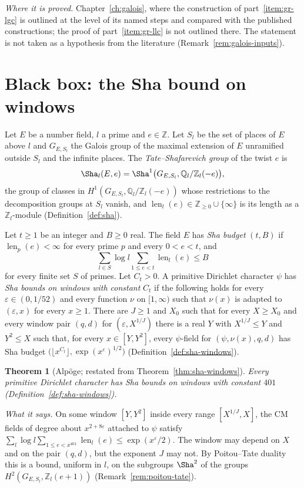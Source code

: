 \documentclass[11pt]{amsbook}
\theoremstyle{plain}
\newtheorem{theorem}{Theorem}[section]
\theoremstyle{definition}
\theoremstyle{remark}
\numberwithin{equation}{section}
\numberwithin{figure}{chapter}
\numberwithin{table}{chapter}
\newcommand{\Q}{\mathbb{Q}}
\newcommand{\Z}{\mathbb{Z}}
\newcommand{\eps}{\varepsilon}
\newcommand{\shalen}{\operatorname{len}}
\begin{document}
\noindent\emph{Where it is proved.} Chapter~\ref{ch:galois}, where
the construction of part~\ref{item:gr-lgc} is outlined at the level
of its named steps and compared with the published constructions;
the proof of part~\ref{item:gr-llc} is not outlined there. The
statement is not taken as a hypothesis from the literature
(Remark~\ref{rem:galois-inputs}).

\section{Black box: the Sha bound on windows}
\label{sec:bb-sha}

Let $E$ be a number field, $l$ a prime and $e\in\Z$. Let $S_l$ be the
set of places of $E$ above $l$ and $G_{E,S_l}$ the Galois group of
the maximal extension of $E$ unramified outside $S_l$ and the
infinite places. The \emph{Tate--Shafarevich group} of the twist $e$
is
\[
\Sha_l(E,e)=\Sha^1\bigl(G_{E,S_l},\Q_l/\Z_l(-e)\bigr),
\]
the group of classes in $H^1(G_{E,S_l},\Q_l/\Z_l(-e))$ whose
restrictions to the decomposition groups at $S_l$ vanish, and
$\shalen_l(e)\in\Z_{\ge0}\cup\{\infty\}$ is its length as a
$\Z_l$-module (Definition~\ref{def:sha}).

Let $t\ge1$ be an integer and $B\ge0$ real. The field $E$ has
\emph{Sha budget} $(t,B)$ if $\shalen_p(e)<\infty$ for every prime
$p$ and every $0<e<t$, and
\[
\sum_{l\in S}\log l\sum_{1\le e<t}\shalen_l(e)\le B
\]
for every finite set $S$ of primes. Let $C_t>0$. A primitive
Dirichlet character $\psi$ has \emph{Sha bounds on windows with
constant} $C_t$ if the following holds for every $\eps\in(0,1/52)$
and every function $\nu$ on $[1,\infty)$ such that $\nu(x)$ is
adapted to $(\eps,x)$ for every $x\ge1$. There are $J\ge1$ and $X_0$
such that for every $X\ge X_0$ and every window pair $(q,d)$ for
$(\eps,X^{1/J})$ there is a real $Y$ with $X^{1/J}\le Y$ and
$Y^2\le X$ such that, for every $x\in[Y,Y^2]$, every $\psi$-field for
$(\psi,\nu(x),q,d)$ has Sha budget
$\bigl(\lfloor x^{C_t}\rfloor,\exp(x^\eps)^{1/2}\bigr)$
(Definition~\ref{def:sha-windows}).

\begin{theorem}[Alp\"oge; restated from Theorem~\ref{thm:sha-windows}]
\label{bb:sha-windows}
Every primitive Dirichlet character has Sha bounds on windows with
constant $401$ (Definition~\ref{def:sha-windows}).
\end{theorem}

\noindent\emph{What it says.} On some window $[Y,Y^2]$ inside every
range $[X^{1/J},X]$, the CM fields of degree about $x^{2+8\eps}$
attached to $\psi$ satisfy
$\sum_l\log l\sum_{1\le e<x^{401}}\shalen_l(e)\le\exp(x^\eps/2)$. The
window may depend on $X$ and on the pair $(q,d)$, but the exponent
$J$ may not. By Poitou--Tate duality this is a bound, uniform in $l$,
on the subgroups $\Sha^2$ of the groups
$H^2(G_{E,S_l},\Z_l(e+1))$ (Remark~\ref{rem:poitou-tate}).
\end{document}
